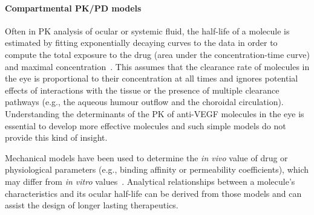 \documentclass{article}
\begin{document}
\paragraph*{Compartmental PK/PD models}

Often in PK analysis of ocular or systemic fluid, the half-life of a molecule is estimated by fitting exponentially decaying curves to the data in order to compute the total exposure to the drug (area under the concentration-time curve) and maximal concentration~\cite{Bakri_2007, Kaiser_2019, Park_2015, Park_2016, Xu_2013}.
This assumes that the clearance rate of molecules in the eye is proportional to their concentration at all times and ignores potential effects of interactions with the tissue or the presence of multiple clearance pathways (e.g., the aqueous humour outflow and the choroidal circulation).
Understanding the determinants of the PK of anti-VEGF molecules in the eye is essential to develop more effective molecules and such simple models do not provide this kind of insight.

Mechanical models have been used to determine the \textit{in vivo} value of drug or physiological parameters (e.g., binding affinity or permeability coefficients), which may differ from \textit{in vitro} values~\cite{Bussing_2020,Caruso_2020,HuttonSmith_2016,HuttonSmith_2017,HuttonSmith_2018}.
Analytical relationships between a molecule's characteristics and its ocular half-life can be derived from those models and can assist the design of longer lasting therapeutics.
\end{document}
